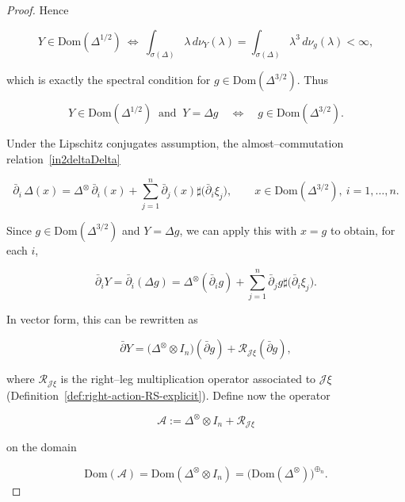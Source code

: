 \documentclass[10pt,a4paper,reqno]{amsart}
\newcommand{\Dom}{\mathrm{Dom}}
\begin{document}
\begin{proof}
Hence


\[
Y\in \Dom(\Delta^{1/2})
\ \Longleftrightarrow\
\int_{\sigma(\Delta)} \lambda\,d\nu_Y(\lambda)
=\int_{\sigma(\Delta)} \lambda^3\,d\nu_g(\lambda)<\infty,
\]


which is exactly the spectral condition for $g\in \Dom(\Delta^{3/2})$. Thus


\[
Y\in \Dom(\Delta^{1/2})\ \text{ and }\ Y=\Delta g
\quad\Longleftrightarrow\quad
g\in \Dom(\Delta^{3/2}).
\]





\medskip

Under the Lipschitz conjugates assumption, the almost–commutation relation~\ref{in2deltaDelta}


\[
\bar{\partial}_i\,\Delta(x)
=
\Delta^{\otimes}\,\bar{\partial}_i(x)
+
\sum_{j=1}^n \bar{\partial}_j(x)\sharp \big(\bar{\partial}_i\xi_j\big),
\qquad x\in \Dom(\Delta^{3/2}),\ i=1,\dots,n.
\]


Since $g\in \Dom(\Delta^{3/2})$ and $Y=\Delta g$, we
can apply this with $x=g$ to obtain, for each $i$,


\[
\bar{\partial}_i Y
=
\bar{\partial}_i(\Delta g)
=
\Delta^{\otimes}(\bar{\partial}_i g)
+
\sum_{j=1}^n \bar{\partial}_j g\sharp\big(\bar{\partial}_i\xi_j\big).
\]


In vector form, this can be rewritten as


\[
\bar\partial Y
=
\big(\Delta^{\otimes}\otimes I_n\big)(\bar\partial g)
+
\mathcal{R}_{\mathscr{J}\xi}(\bar\partial g),
\]


where $\mathcal{R}_{\mathscr{J}\xi}$ is the right–leg multiplication operator associated to
$\mathscr{J}\xi$ (Definition~\ref{def:right-action-RS-explicit}).
\bigskip
Define now the operator


\[
\mathcal{A}
:=
\Delta^{\otimes}\otimes I_n+ \mathcal{R}_{\mathscr{J}\xi}
\]


on the domain


\[
\Dom(\mathcal{A})=\Dom(\Delta^{\otimes}\otimes I_n)=\big(\Dom(\Delta^{\otimes})\big)^{\oplus_n}.
\]



\end{proof}
\end{document}
